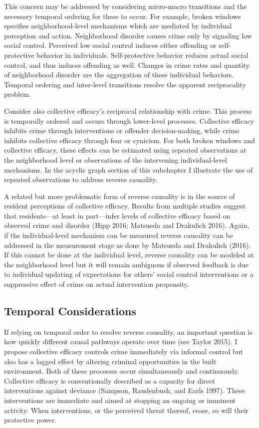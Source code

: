 \documentclass [11pt, proquest] {uwthesis}[2015/03/03]
\begin{document}
This concern may be addressed by considering micro-macro transitions and the necessary temporal ordering for these to occur. For example, broken windows specifies neighborhood-level mechanisms which are mediated by individual perception and action. Neighborhood disorder causes crime only by signaling low social control. Perceived low social control induces either offending or self-protective behavior in individuals. Self-protective behavior reduces actual social control, and thus induces offending as well. Changes in crime rates and quantity of neighborhood disorder are the aggregation of these individual behaviors. Temporal ordering and inter-level transitions resolve the apparent reciprocality problem.

Consider also collective efficacy's reciprocal relationship with crime. This process is temporally ordered and occurs through lower-level processes. Collective efficacy inhibits crime through interventions or offender decision-making, while crime inhibits collective efficacy through fear or cynicism. For both broken windows and collective efficacy, these effects can be estimated using repeated observations at the neighborhood level or observations of the intervening individual-level mechanisms. In the acyclic graph section of this subchapter I illustrate the use of repeated observations to address reverse causality.

A related but more problematic form of reverse causality is in the source of resident perceptions of collective efficacy. Results from multiple studies suggest that residents---at least in part---infer levels of collective efficacy based on observed crime and disorder (Hipp 2016; Matsueda and Drakulich 2016). Again, if the individual-level mechanism can be measured reverse causality can be addressed in the measurement stage as done by Matsueda and Drakulich (2016). If this cannot be done at the individual level, reverse causality can be modeled at the neighborhood level but it will remain ambiguous if observed feedback is due to individual updating of expectations for others' social control interventions or a suppressive effect of crime on actual intervention propensity.

\hypertarget{temporal-considerations}{%
\subsection{Temporal Considerations}\label{temporal-considerations}}

If relying on temporal order to resolve reverse causality, an important question is how quickly different causal pathways operate over time (see Taylor 2015). I propose collective efficacy controls crime immediately via informal control but also has a lagged effect by altering criminal opportunities in the built environment. Both of these processes occur simultaneously and continuously. Collective efficacy is conventionally described as a capacity for direct interventions against deviance (Sampson, Raudenbush, and Earls 1997). These interventions are immediate and aimed at stopping an ongoing or imminent activity. When interventions, or the perceived threat thereof, cease, so will their protective power.
\end{document}
